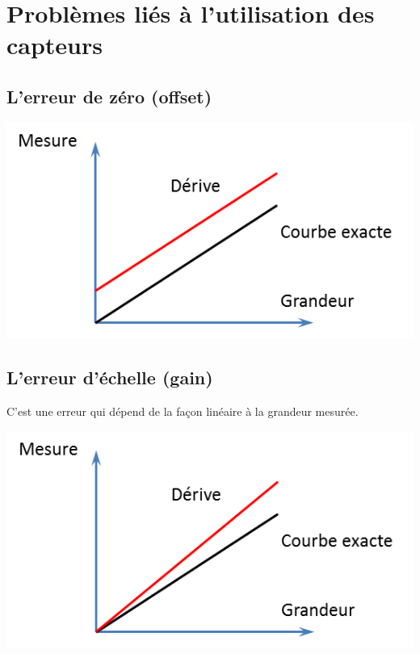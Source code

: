\documentclass[10pt]{article}
\begin{document}
\section{Problèmes liés à l'utilisation des capteurs}

\subsection{L'erreur de zéro (offset)}
\begin{center}
\includegraphics[width=.36\textwidth]{images/offset}
\end{center}

\subsection{L'erreur d'échelle (gain)}
\begin{minipage}[c]{.45\linewidth}
C'est une erreur qui dépend de la façon linéaire à la grandeur mesurée.
\end{minipage}\hfill
\begin{minipage}[c]{.45\linewidth}
\begin{center}
\includegraphics[width=.8\textwidth]{images/gain}
\end{center}
\end{minipage}
\end{document}
